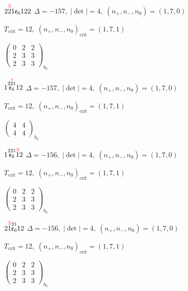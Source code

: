 \documentclass[10pt]{article}
\begin{document}
\smallskip

$2\overset{\textcolor{red}{3}}{2}1\mathfrak{e}_6122$ \quad $\Delta=-157,\; |\det|=4,\; (n_+,n_-,n_0)=(1,7,0)$

\hspace{1em}$T_{\text{crit}}=12,\; (n_+,n_-,n_0)_{\text{crit}}=(1,7,1)$

\hspace{2em}$\left(\begin{smallmatrix}0 & 2 & 2 \\ 2 & 3 & 3 \\ 2 & 3 & 3\end{smallmatrix}\right)_{\!b_0}$

\smallskip

$1\overset{2\overset{\textcolor{red}{3}}{2}1}{\mathfrak{e}_6}12$ \quad $\Delta=-157,\; |\det|=4,\; (n_+,n_-,n_0)=(1,7,0)$

\hspace{1em}$T_{\text{crit}}=12,\; (n_+,n_-,n_0)_{\text{crit}}=(1,7,1)$

\hspace{2em}$\left(\begin{smallmatrix}4 & 4 \\ 4 & 4\end{smallmatrix}\right)_{\!b_0}$

$1\overset{221}{\mathfrak{e}_6}\overset{\textcolor{red}{3}}{1}2$ \quad $\Delta=-156,\; |\det|=4,\; (n_+,n_-,n_0)=(1,7,0)$

\hspace{1em}$T_{\text{crit}}=12,\; (n_+,n_-,n_0)_{\text{crit}}=(1,7,1)$

\hspace{2em}$\left(\begin{smallmatrix}0 & 2 & 2 \\ 2 & 3 & 3 \\ 2 & 3 & 3\end{smallmatrix}\right)_{\!b_0}$

\smallskip

$2\overset{\textcolor{red}{3}}{1}\overset{21}{\mathfrak{e}_6}12$ \quad $\Delta=-156,\; |\det|=4,\; (n_+,n_-,n_0)=(1,7,0)$

\hspace{1em}$T_{\text{crit}}=12,\; (n_+,n_-,n_0)_{\text{crit}}=(1,7,1)$

\hspace{2em}$\left(\begin{smallmatrix}0 & 2 & 2 \\ 2 & 3 & 3 \\ 2 & 3 & 3\end{smallmatrix}\right)_{\!b_0}$
\end{document}
